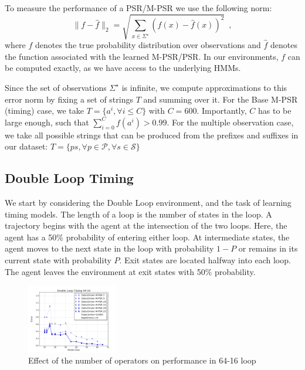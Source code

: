 \documentclass[letterpaper]{article}
\newcommand{\sstar}{\Sigma^\star}
\newcommand{\Sstar}{\sstar}
\newcommand{\Ps}{\mathcal{P}}
\newcommand{\Ss}{\mathcal{S}}
\begin{document}

To measure the performance of a PSR/M-PSR we use the following norm:
\begin{equation*}
\|f - \hat{f}\|_2 = \sqrt{\sum_{x \in \Sstar}(f(x) - \hat{f}(x))^2} \enspace,
\end{equation*}
where $f$ denotes the true probability distribution over observations and $\hat{f}$ denotes the function associated with the learned M-PSR/PSR. In our environments, $f$ can be computed exactly, as we have access to the underlying HMMs.

Since the set of observations $\Sigma^{\star}$ is infinite, we compute approximations to this error norm by fixing a set of strings $T$ and summing over it. For the Base M-PSR (timing) case, we take $T = \{a^i, \forall i \leq C\}$ with $C=600$. Importantly, $C$ has to be  large enough, such that $\sum_{i=0}^{C} f(a^i)>0.99$. For the multiple observation case, we take all possible strings that can be produced from the prefixes and suffixes in our dataset: $T = \{ps, \forall p \in \Ps, \forall s \in \Ss\} $


\subsection{Double Loop Timing}

We start by considering the Double Loop environment, and the task of learning timing models. The length of a loop is the number of states in the loop. A trajectory begins with the agent at the intersection of the two loops. Here, the agent has a 50\% probability of entering either loop. At intermediate states, the agent moves to the next state in the loop with probability $1-P$ or remains in its current state with probability $P$. Exit states are located halfway into each loop. The agent leaves the environment at exit states with 50\% probability. 


\begin{figure}[ht!]
\centering
\includegraphics[width=40mm]{NumOpsTiming.png}\vspace*{-4mm}
\caption{Effect of the number of operators on performance in 64-16 loop\label{fig-numops}\vspace*{-4mm}}
\end{figure} 
\end{document}
